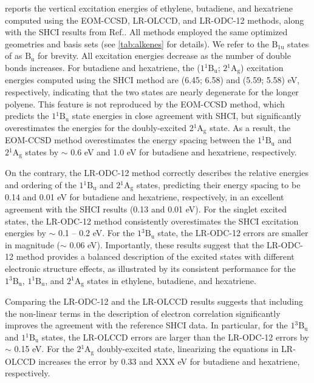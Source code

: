  reports the vertical excitation energies of ethylene,
butadiene, and hexatriene computed using the EOM-CCSD, LR-OLCCD, and LR-ODC-12
methods, along with the SHCI results from Ref.\@ {}.
All methods employed the same optimized geometries and basis sets (see
\cref{tab:alkenes} for details).
We refer to the $\mathrm{B_{1u}}$ states of  as $\mathrm{B_{u}}$ for
brevity.
All excitation energies decrease as the number of double bonds increases.
For butadiene and hexatriene, the ($1{}^1\mathrm{B_{u}}$; $2{}^1\mathrm{A_{g}}$)
excitation energies computed using the SHCI method are (6.45; 6.58) and (5.59;
5.58) eV, respectively, indicating that the two states are nearly degenerate for
the longer polyene.
This feature is not reproduced by the EOM-CCSD method, which predicts the
$1{}^1\mathrm{B_{u}}$ state energies in close agreement with SHCI, but
significantly overestimates the energies for the doubly-excited
$2{}^1\mathrm{A_{g}}$ state.
As a result, the EOM-CCSD method overestimates the energy spacing between the
$1{}^1\mathrm{B_{u}}$ and $2{}^1\mathrm{A_{g}}$ states by $\sim$ 0.6 eV and 1.0
eV for butadiene and hexatriene, respectively. 

On the contrary, the LR-ODC-12 method correctly describes the relative energies
and ordering of the $1{}^1\mathrm{B_{u}}$ and $2{}^1\mathrm{A_{g}}$ states,
predicting their energy spacing to be 0.14 and 0.01 eV for butadiene and
hexatriene, respectively, in an excellent agreement with the SHCI results (0.13
and 0.01 eV).
For the singlet excited states, the LR-ODC-12 method consistently overestimates
the SHCI excitation energies by $\sim$ 0.1 -- 0.2 eV.
For the $1{}^3\mathrm{B_{u}}$ state, the LR-ODC-12 errors are smaller in
magnitude ($\sim$ 0.06 eV).
Importantly, these results suggest that the LR-ODC-12 method provides a balanced
description of the excited states with different electronic structure effects,
as illustrated by its consistent performance for the $1{}^3\mathrm{B_{u}}$,
$1{}^1\mathrm{B_{u}}$, and $2{}^1\mathrm{A_{g}}$ states in ethylene, butadiene,
and hexatriene.

Comparing the LR-ODC-12 and the LR-OLCCD results suggests that including the
non-linear terms in the description of electron correlation significantly
improves the agreement with the reference SHCI data.
In particular, for the $1{}^3\mathrm{B_{u}}$ and $1{}^1\mathrm{B_{u}}$ states,
the LR-OLCCD errors are larger than the LR-ODC-12 errors by $\sim$ 0.15 eV.
For the $2{}^1\mathrm{A_{g}}$ doubly-excited state, linearizing the equations in
LR-OLCCD increases the error by 0.33 and {\color{red} XXX} eV for butadiene and
hexatriene, respectively. 



